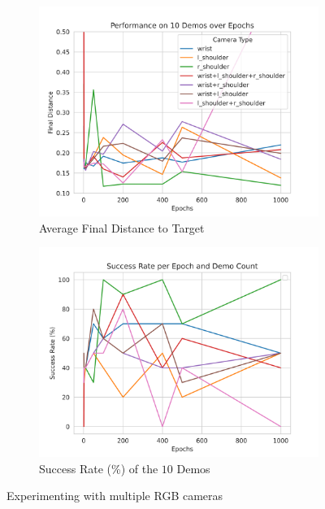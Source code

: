 \begin{figure}[htpb] %
  \begin{subfigure}{0.50\linewidth}
    \centering
    \includegraphics[width=\linewidth]{assets/cam-comb/reach-no-obs/rno_random-cams.png}
    \caption{Average Final Distance to Target}\label{subfig:rno-random-cams-dist}
  \end{subfigure}
  \hfill
  \begin{subfigure}{0.50\linewidth}
    \centering
    \includegraphics[width=\linewidth]{assets/cam-comb/reach-no-obs/rno_random-cam_success.png}
    \caption{Success Rate (\%) of the $10$ Demos}\label{subfig:rno-random-cams-success}
  \end{subfigure}
  \caption{Experimenting with multiple RGB cameras}\label{fig:rno-random-cams}
\end{figure}

